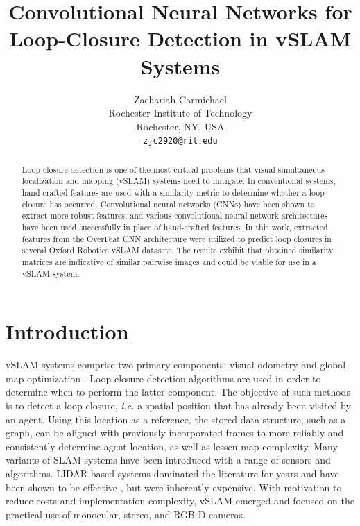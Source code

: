 \documentclass[10pt,twocolumn,letterpaper]{article}
\begin{document}
\title{Convolutional Neural Networks for Loop-Closure Detection in vSLAM Systems}

\author{Zachariah Carmichael\\
Rochester Institute of Technology\\
Rochester, NY, USA\\
{\tt\small zjc2920@rit.edu}
}

\maketitle

\begin{abstract}
  Loop-closure detection is one of the most critical problems that visual simultaneous localization and mapping (vSLAM) systems need to mitigate. In conventional systems, hand-crafted features are used 
with a similarity metric to determine whether a loop-closure has occurred. Convolutional neural networks (CNNs) have been shown to extract more robust features, and various convolutional neural network 
architectures have been used successfully in place of hand-crafted features. In this work, extracted features from the \textup{OverFeat} CNN architecture were utilized to predict loop closures in several 
\textup{Oxford Robotics} vSLAM datasets. The results exhibit that obtained similarity matrices are indicative of similar pairwise images and could be viable for use in a vSLAM system.
\end{abstract}

\section{Introduction}
vSLAM systems comprise two primary components: visual odometry and global map optimization \cite{taketomi_visual_2017}. Loop-closure detection algorithms are used in order to determine when to perform 
the latter component. The objective of such methods is to detect a loop-closure, \textit{i.e.} a spatial position that has already been visited by an agent. Using this location as a reference, the stored 
data structure, such as a graph, can be aligned with previously incorporated frames to more reliably and consistently determine agent location, as well as lessen map complexity. Many variants of SLAM 
systems have been introduced with a range of sensors and algorithms. LIDAR-based systems dominated the literature for years and have been shown to be effective 
\cite{levinson_robust_2010,levinson_map-based_2007}, but were inherently expensive. With motivation to reduce costs and implementation complexity, vSLAM emerged and focused on the practical use of 
monocular, stereo, and RGB-D cameras.
\end{document}
